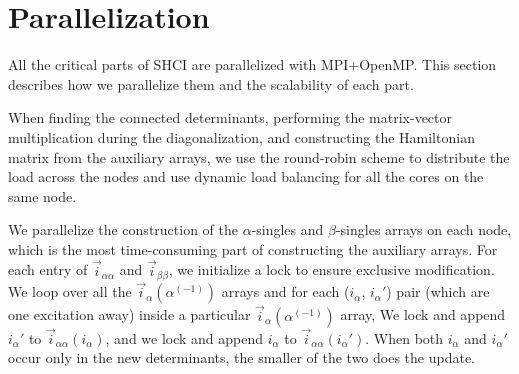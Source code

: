 \documentclass[%
reprint,
 superscriptaddress,
 amsmath,amssymb,
 aps,
]{revtex4-1}
\def\ia{i_\alpha}
\def\vecia{\vec{i}_\alpha}
\def\veciaa{\vec{i}_{\alpha\alpha}}
\def\vecibb{\vec{i}_{\beta\beta}}
\begin{document}
\section{Parallelization}
\label{para}

All the critical parts of SHCI are parallelized with MPI+OpenMP.
This section describes how we parallelize them and the scalability of each part.

When finding the connected determinants, performing the matrix-vector multiplication during the diagonalization,
and constructing the Hamiltonian matrix from the auxiliary arrays, we use the round-robin scheme to distribute the load across the nodes
and use dynamic load balancing for all the cores on the same node.


We parallelize the construction of the $\alpha$-singles and $\beta$-singles arrays on each node, which is the most time-consuming part of constructing the auxiliary arrays.
For each entry of $\veciaa$ and $\vecibb$, we initialize a lock to ensure exclusive modification.
We loop over all the $\vecia({\alpha^{(-1)}})$ arrays and for each ($\ia$, $\ia'$) pair (which are one excitation away) inside a particular $\vecia({\alpha^{(-1)}})$ array,
We lock and append $\ia'$ to $\veciaa{(\ia)}$, and
we lock and append $\ia$ to $\veciaa{(\ia')}$.
When both $\ia$ and $\ia'$ occur only in the new determinants, the smaller of the two does the update.
\end{document}
